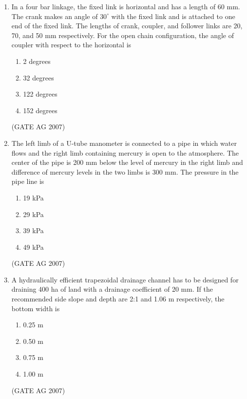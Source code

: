 \documentclass[journal,12pt,onecolumn]{IEEEtran}
\theoremstyle{remark}
\begin{document}
\begin{enumerate}
\item In a four bar linkage, the fixed link is horizontal and has a length of 60 mm. The crank makes an angle of $30^\circ$ with the fixed link and is attached to one end of the fixed link. The lengths of crank, coupler, and follower links are 20, 70, and 50 mm respectively. For the open chain configuration, the angle of coupler with respect to the horizontal is
\begin{multicols}{4}
\begin{enumerate}
    \item 2 degrees
    \item 32 degrees
    \item 122 degrees
    \item 152 degrees
\end{enumerate}
\end{multicols}
\hfill(GATE AG 2007)

\item The left limb of a U-tube manometer is connected to a pipe in which water flows and the right limb containing mercury is open to the atmosphere. The center of the pipe is 200 mm below the level of mercury in the right limb and difference of mercury levels in the two limbs is 300 mm. The pressure in the pipe line is
\begin{multicols}{4}
\begin{enumerate}
    \item 19 kPa
    \item 29 kPa
    \item 39 kPa
    \item 49 kPa
\end{enumerate}
\end{multicols}
\hfill(GATE AG 2007)

\item A hydraulically efficient trapezoidal drainage channel has to be designed for draining 400 ha of land with a drainage coefficient of 20 mm. If the recommended side slope and depth are 2:1 and 1.06 m respectively, the bottom width is
\begin{multicols}{4}
\begin{enumerate}
    \item 0.25 m
    \item 0.50 m
    \item 0.75 m
    \item 1.00 m
\end{enumerate}
\end{multicols}
\hfill(GATE AG 2007)


\end{enumerate}
\end{document}
